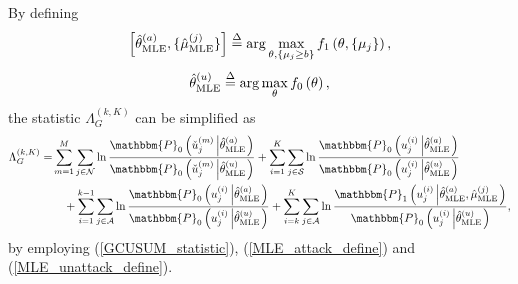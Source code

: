 \documentclass[11pt, draftclsnofoot, onecolumn]{IEEEtran}
\newcommand{\bbP}{\mathbbm{P}}
\begin{document}

By defining
\begin{equation} \label{MLE_attack_define}
\left[ {\hat \theta _{{\rm{MLE}}}^{(a)},\{ {{\hat \mu }_{\text{MLE}}^{(j)}}\} } \right]  \buildrel \Delta \over = \arg \mathop {\max }\limits_{\theta ,\{ {\mu _j} \ge b\} } {f_1}\left( {\theta ,\{ {\mu _j}\} } \right),
\end{equation}
\begin{equation} \label{MLE_unattack_define}
\hat \theta _{{\rm{MLE}}}^{(u)} \buildrel \Delta \over = \arg \mathop {\max }\limits_\theta  {f_0}\left( \theta  \right),
\end{equation}
the statistic $\Lambda _G^{(k,K)}$ can be simplified as
\begin{align} \notag
\Lambda _G^{(k,K)}  = & \sum\limits_{m = 1}^M {\sum\limits_{j \in {\cal N}} {\ln \frac{{{\bbP_0}\left( {{\check{u}}_j^{(m)}\left| {\hat \theta _{{\rm{MLE}}}^{(a)}} \right.} \right)}}{{{\bbP_0}\left( {{\check{u}}_j^{(m)}\left| {\hat \theta _{{\rm{MLE}}}^{(u)}} \right.} \right)}}} }  + \sum\limits_{i = 1}^K {\sum\limits_{j \in {\cal S}} {\ln \frac{{{\bbP_0}\left( {u_j^{(i)}\left| {\hat \theta _{{\rm{MLE}}}^{(a)}} \right.} \right)}}{{{\bbP_0}\left( {u_j^{(i)}\left| {\hat \theta _{{\rm{MLE}}}^{(u)}} \right.} \right)}}} } \\ \label{GCUSUM_statistic_simplified}
& \quad + \sum\limits_{i = 1}^{k - 1} {\sum\limits_{j \in {\cal A}} {\ln \frac{{{\bbP_0}\left( {u_j^{(i)}\left| {\hat \theta _{{\rm{MLE}}}^{(a)}} \right.} \right)}}{{{\bbP_0}\left( {u_j^{(i)}\left| {\hat \theta _{{\rm{MLE}}}^{(u)}} \right.} \right)}}} }  + \sum\limits_{i = k}^K {\sum\limits_{j \in {\cal A}} {\ln \frac{{{\bbP_1}\left( {u_j^{(i)}\left| {\hat \theta _{{\rm{MLE}}}^{(a)},{{\hat \mu }_{\text{MLE}}^{(j)}}} \right.} \right)}}{{{\bbP_0}\left( {u_j^{(i)}\left| {\hat \theta _{{\rm{MLE}}}^{(u)}} \right.} \right)}}} },
\end{align}
by employing (\ref{GCUSUM_statistic}), (\ref{MLE_attack_define}) and (\ref{MLE_unattack_define}).
\end{document}
